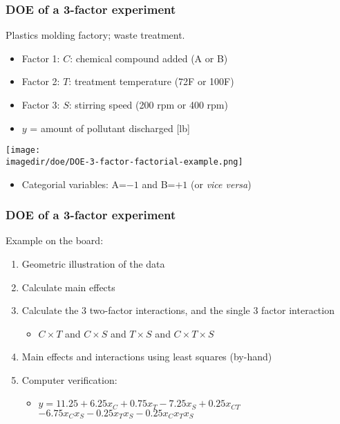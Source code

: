 \begin{frame}\frametitle{DOE of a 3-factor experiment}

	Plastics molding factory; waste treatment.
	\begin{itemize}
		\item	Factor 1: $C$: chemical compound added (A or B)
		\item	Factor 2: $T$: treatment temperature (72F or 100F)
		\item	Factor 3: $S$: stirring speed (200 rpm or 400 rpm)
		\item	$y$ = amount of pollutant discharged [lb]
	\end{itemize}
	\begin{center}
		\texttt{[image: \\imagedir/doe/DOE-3-factor-factorial-example.png]}
	\end{center}
	\begin{itemize}
		\item	Categorial variables: A=$-1$ and B=$+1$ (or \emph{vice versa})
	\end{itemize}
\end{frame}

\begin{frame}\frametitle{DOE of a 3-factor experiment}

	Example on the board:
	\begin{enumerate}
		\item	Geometric illustration of the data
		\item	Calculate main effects
		\item	Calculate the 3 two-factor interactions, and the single 3 factor interaction
		\begin{itemize}
			\item	$C \times T$ and $C \times S$ and $T \times S$ and $C \times T \times S$
		\end{itemize}
		\item	Main effects and interactions using least squares (by-hand)
		\item	Computer verification:
		\begin{itemize}
			\item	$y = 11.25 + 6.25x_C + 0.75x_T -7.25x_S + 0.25 x_{CT}$\\
					$-6.75 x_C x_S -0.25 x_T x_S - 0.25 x_Cx_Tx_S$
		\end{itemize}
	\end{enumerate}
\end{frame}

